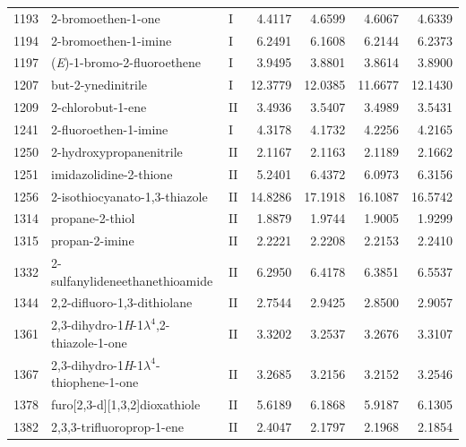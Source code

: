 \begin{longtable}{rlld{2.5}d{2.5}d{2.5}d{2.5}}
    1193 & 2-bromoethen-1-one                                     & I  & 4.4117  & 4.6599  & 4.6067  & 4.6339  \\
    1194 & 2-bromoethen-1-imine                                   & I  & 6.2491  & 6.1608  & 6.2144  & 6.2373  \\
    1197 & (\textit{E})-1-bromo-2-fluoroethene                    & I  & 3.9495  & 3.8801  & 3.8614  & 3.8900  \\
    1207 & but-2-ynedinitrile                                     & I  & 12.3779 & 12.0385 & 11.6677 & 12.1430 \\
    1209 & 2-chlorobut-1-ene                                      & II & 3.4936  & 3.5407  & 3.4989  & 3.5431  \\
    1241 & 2-fluoroethen-1-imine                                  & I  & 4.3178  & 4.1732  & 4.2256  & 4.2165  \\
    1250 & 2-hydroxypropanenitrile                                & II & 2.1167  & 2.1163  & 2.1189  & 2.1662  \\
    1251 & imidazolidine-2-thione                                 & II & 5.2401  & 6.4372  & 6.0973  & 6.3156  \\
    1256 & 2-isothiocyanato-1,3-thiazole                          & II & 14.8286 & 17.1918 & 16.1087 & 16.5742 \\
    1314 & propane-2-thiol                                        & II & 1.8879  & 1.9744  & 1.9005  & 1.9299  \\
    1315 & propan-2-imine                                         & II & 2.2221  & 2.2208  & 2.2153  & 2.2410  \\
    1332 & 2-sulfanylideneethanethioamide                         & II & 6.2950  & 6.4178  & 6.3851  & 6.5537  \\
    1344 & 2,2-difluoro-1,3-dithiolane                            & II & 2.7544  & 2.9425  & 2.8500  & 2.9057  \\
    1361 & 2,3-dihydro-1\textit{H}-1$\lambda^4$,2-thiazole-1-one  & II & 3.3202  & 3.2537  & 3.2676  & 3.3107  \\
    1367 & 2,3-dihydro-1\textit{H}-1$\lambda^4$-thiophene-1-one   & II & 3.2685  & 3.2156  & 3.2152  & 3.2546  \\
    1378 & furo[2,3-d][1,3,2]dioxathiole                          & II & 5.6189  & 6.1868  & 5.9187  & 6.1305  \\
    1382 & 2,3,3-trifluoroprop-1-ene                              & II & 2.4047  & 2.1797  & 2.1968  & 2.1854  \\

\end{longtable}
